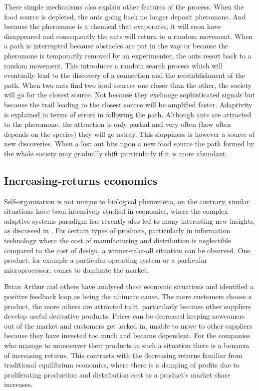 These simple mechanisms also explain other features of the process. 
When the food source is depleted, the ants going 
back no longer deposit pheromone. And because the pheromone is 
a chemical that evaporates, it will soon have disappeared and consequently 
the ants will return to a random movement. When a path 
is interrupted because obstacles
are put in the way or because the pheromone is temporarily removed by 
an experimenter, the ants resort back to a random movement. This introduces
a random search process 
which will eventually lead to the discovery of a connection and the 
reestablishment of the path. When two ants find two food sources one closer
than the other, the society will go for the closest source. Not because they 
exchange sophisticated signals but because the trail leading to the 
closest source will be amplified faster. Adaptivity is explained in 
terms of errors in following the path. Although ants are attracted 
to the pheromone, the attraction is only partial and 
very often (how often depends on the species)
they will go astray. This sloppiness is however a source of new discoveries. 
When a lost ant hits upon a new food source
the path formed by the whole society may gradually shift
particularly if it is more abundant.

\subsection{Increasing-returns economics}

Self-organisation is not unique to biological phenomena,
on the contrary, similar situations have been intensively
studied in economics, where
the complex adaptive systems paradigm has recently also 
led to many interesting new insights, as discussed in \cite{Arthur:1996}. 
For certain types of products, particularly in 
information technology where the cost of manufacturing 
and distribution is neglectible compared to the cost
of design, a winner-take-all situation can be observed. 
One product, for example a particular operating system or 
a particular microprocessor, comes to dominate the market. 

Brian Arthur and others have analysed these economic situations 
and identified a positive feedback loop as being the ultimate cause.
The more customers choose a product, the more 
others are attracted to it, particularly because 
other suppliers develop useful derivative products. Prices can 
be decreased keeping newcomers out of the market and 
customers get locked in, unable to move to other suppliers
because they have invested too much and became dependent. 
For the companies who manage to manoeuver their products
in such a situation there is a bonanza of increasing returns. 
This contrasts with the decreasing returns familiar 
from traditional equilibrium economics, where there is 
a damping of profits due to proliferating production and 
distribution cost as a product's market share increases. 

